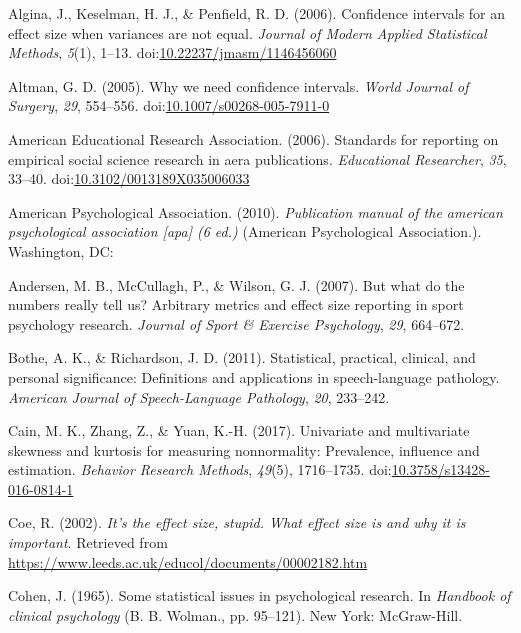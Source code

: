\documentclass[
  man,floatsintext]{apa6}
\begin{document}
\leavevmode\hypertarget{ref-Algina_et_al_2006}{}%
Algina, J., Keselman, H. J., \& Penfield, R. D. (2006). Confidence intervals for an effect size when variances are not equal. \emph{Journal of Modern Applied Statistical Methods}, \emph{5}(1), 1--13. doi:\href{https://doi.org/10.22237/jmasm/1146456060}{10.22237/jmasm/1146456060}

\leavevmode\hypertarget{ref-Altman_2005}{}%
Altman, G. D. (2005). Why we need confidence intervals. \emph{World Journal of Surgery}, \emph{29}, 554--556. doi:\href{https://doi.org/10.1007/s00268-005-7911-0}{10.1007/s00268-005-7911-0}

\leavevmode\hypertarget{ref-AERA_2006}{}%
American Educational Research Association. (2006). Standards for reporting on empirical social science research in aera publications. \emph{Educational Researcher}, \emph{35}, 33--40. doi:\href{https://doi.org/10.3102/0013189X035006033}{10.3102/0013189X035006033}

\leavevmode\hypertarget{ref-APA_2010}{}%
American Psychological Association. (2010). \emph{Publication manual of the american psychological association {[}apa{]} (6 ed.)} (American Psychological Association.). Washington, DC:

\leavevmode\hypertarget{ref-Andersen_et_al_2007}{}%
Andersen, M. B., McCullagh, P., \& Wilson, G. J. (2007). But what do the numbers really tell us? Arbitrary metrics and effect size reporting in sport psychology research. \emph{Journal of Sport \& Exercise Psychology}, \emph{29}, 664--672.

\leavevmode\hypertarget{ref-Bothe_Richardson_2011}{}%
Bothe, A. K., \& Richardson, J. D. (2011). Statistical, practical, clinical, and personal significance: Definitions and applications in speech-language pathology. \emph{American Journal of Speech-Language Pathology}, \emph{20}, 233--242.

\leavevmode\hypertarget{ref-Cain_et_al_2017}{}%
Cain, M. K., Zhang, Z., \& Yuan, K.-H. (2017). Univariate and multivariate skewness and kurtosis for measuring nonnormality: Prevalence, influence and estimation. \emph{Behavior Research Methods}, \emph{49}(5), 1716--1735. doi:\href{https://doi.org/10.3758/s13428-016-0814-1}{10.3758/s13428-016-0814-1}

\leavevmode\hypertarget{ref-Coe_2002}{}%
Coe, R. (2002). \emph{It's the effect size, stupid. What effect size is and why it is important}. Retrieved from \url{https://www.leeds.ac.uk/educol/documents/00002182.htm}

\leavevmode\hypertarget{ref-Cohen_1965}{}%
Cohen, J. (1965). Some statistical issues in psychological research. In \emph{Handbook of clinical psychology} (B. B. Wolman., pp. 95--121). New York: McGraw-Hill.
\end{document}
